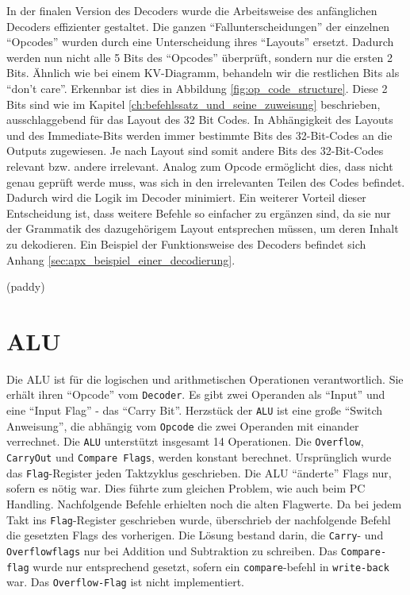 \documentclass[paper=a4,fontsize=12pt,twocolumn]{scrreprt}
\begin{document}
In der finalen Version des Decoders wurde die Arbeitsweise des anfänglichen Decoders effizienter gestaltet.
Die ganzen \enquote{Fallunterscheidungen} der einzelnen \enquote{Opcodes} wurden durch eine Unterscheidung ihres \enquote{Layouts} ersetzt.
Dadurch werden nun nicht alle 5 Bits des \enquote{Opcodes} überprüft, sondern nur die ersten 2 Bits.
Ähnlich wie bei einem KV-Diagramm, behandeln wir die restlichen Bits als \enquote{don't care}.
Erkennbar ist dies in Abbildung \ref{fig:op_code_structure}.
Diese 2 Bits sind wie im Kapitel \ref{ch:befehlssatz_und_seine_zuweisung} beschrieben, ausschlaggebend für das Layout des 32 Bit Codes.
In Abhängigkeit des Layouts und des Immediate-Bits werden immer bestimmte Bits des 32-Bit-Codes an die Outputs zugewiesen.
Je nach Layout sind somit andere Bits des 32-Bit-Codes relevant bzw. andere irrelevant.
Analog zum Opcode ermöglicht dies, dass nicht genau geprüft werde muss, was sich in den irrelevanten Teilen des Codes befindet.
Dadurch wird die Logik im Decoder minimiert. 
Ein weiterer Vorteil dieser Entscheidung ist, dass weitere Befehle so einfacher zu ergänzen sind, da sie nur der Grammatik des dazugehörigem Layout entsprechen müssen, um deren Inhalt zu dekodieren.
Ein Beispiel der Funktionsweise des Decoders befindet sich Anhang \ref{sec:apx_beispiel_einer_decodierung}.

(paddy)

\section{ALU}
\label{sec:alu}

Die ALU ist für die logischen und arithmetischen Operationen verantwortlich.
Sie erhält ihren \enquote{Opcode} vom \texttt{Decoder}.
Es gibt zwei Operanden als \enquote{Input} und eine \enquote{Input Flag} - das \enquote{Carry Bit}.
Herzstück der \texttt{ALU} ist eine große \enquote{Switch Anweisung}, die abhängig vom \texttt{Opcode} die zwei Operanden mit einander verrechnet.
Die \texttt{ALU} unterstützt insgesamt 14 Operationen.
Die \texttt{Overflow}, \texttt{CarryOut} und \texttt{Compare Flags}, werden konstant berechnet.
Ursprünglich wurde das \texttt{Flag}-Register jeden Taktzyklus geschrieben.
Die ALU \enquote{änderte} Flags nur, sofern es nötig war.
Dies führte zum gleichen Problem, wie auch beim PC Handling.
Nachfolgende Befehle erhielten noch die alten Flagwerte. 
Da bei jedem Takt ins \texttt{Flag}-Register geschrieben wurde, überschrieb der nachfolgende Befehl die gesetzten Flags des vorherigen.
Die Lösung bestand darin, die \texttt{Carry}- und \texttt{Overflowflags} nur bei Addition und Subtraktion zu schreiben.
Das \texttt{Compare-flag} wurde nur entsprechend gesetzt, sofern ein \texttt{compare}-befehl in \texttt{write-back} war.
Das \texttt{Overflow-Flag} ist nicht implementiert.
\end{document}
